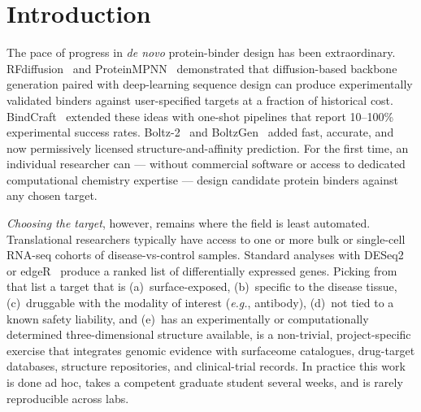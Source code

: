 \documentclass[11pt,letterpaper]{article}
\begin{document}
\begin{abstract}
Google's API does not permit launching a free-tier notebook from a CLI; it is
a demonstration rather than a reproducibility path. A server-rendered web
interface runs the same discovery pipeline in a browser, launched locally
with \texttt{bindsight ui}; its evidence surface is additionally published
as static pages on the project documentation site at
\href{https://mikhaeelatefrizk.github.io/bindsight/}{mikhaeelatefrizk.github.io/bindsight}. On a real
TCGA breast-carcinoma cohort (tumor vs.\ adjacent normal, auto-downloaded from
NIH/GDC), the pipeline discovers antibody-tractable cell-surface antigens
over-expressed in tumor with full provenance; established targets such as ERBB2
(HER2) surface among the candidates when their expression signal is present.
Software is
licensed GNU AGPL-3.0-or-later and available at
\href{https://github.com/mikhaeelatefrizk/bindsight}{github.com/mikhaeelatefrizk/bindsight}.
\end{abstract}

\section{Introduction}

The pace of progress in \textit{de novo} protein-binder design has been
extraordinary. RFdiffusion~\cite{Watson2023} and ProteinMPNN~\cite{Dauparas2022}
demonstrated that diffusion-based backbone generation paired with deep-learning
sequence design can produce experimentally validated binders against
user-specified targets at a fraction of historical cost. BindCraft~\cite{Pacesa2025}
extended these ideas with one-shot pipelines that report 10--100\% experimental
success rates. Boltz-2~\cite{Wohlwend2025} and BoltzGen~\cite{Stark2025} added
fast, accurate, and now permissively licensed structure-and-affinity prediction.
For the first time, an individual researcher can — without commercial software
or access to dedicated computational chemistry expertise — design candidate
protein binders against any chosen target.

\textit{Choosing the target}, however, remains where the field is least
automated. Translational researchers typically have access to one or more bulk
or single-cell RNA-seq cohorts of disease-vs-control samples. Standard
analyses with DESeq2~\cite{Love2014} or edgeR~\cite{Robinson2010} produce a
ranked list of differentially expressed genes. Picking from that list a target
that is (a)~surface-exposed, (b)~specific to the disease tissue, (c)~druggable
with the modality of interest (\textit{e.g.}, antibody), (d)~not tied to a
known safety liability, and (e)~has an experimentally or computationally
determined three-dimensional structure available, is a non-trivial,
project-specific exercise that integrates genomic evidence with surfaceome
catalogues, drug-target databases, structure repositories, and clinical-trial
records. In practice this work is done ad hoc, takes a competent graduate
student several weeks, and is rarely reproducible across labs.
\end{document}
